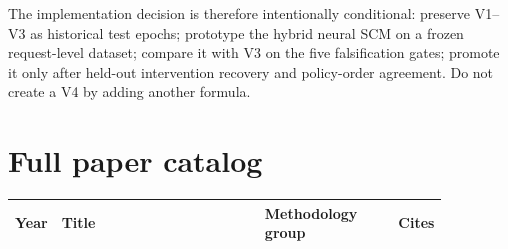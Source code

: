 \documentclass[10.5pt,a4paper]{article}
\begin{document}
The implementation decision is therefore intentionally conditional: preserve V1--V3 as historical test epochs; prototype the hybrid neural SCM on a frozen request-level dataset; compare it with V3 on the five falsification gates; promote it only after held-out intervention recovery and policy-order agreement. Do not create a V4 by adding another formula.

\appendix
\section{Full paper catalog}
\footnotesize
\begin{longtable}{p{0.07\linewidth}p{0.48\linewidth}p{0.31\linewidth}r}
\toprule
Year & Title & Methodology group & Cites \\
\midrule
\endhead

\end{longtable}

\nocite{*}

\end{document}
